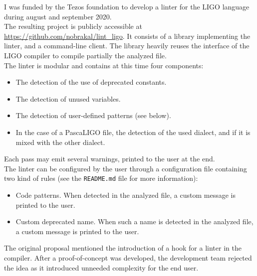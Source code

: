 I was funded by the Tezos foundation to develop a linter for the LIGO language during august and september 2020.\\
The resulting project is publicly accessible at \url{https://github.com/nobrakal/lint\_ligo}.
It consists of a library implementing the linter, and a command-line client.
The library heavily reuses the interface of the LIGO compiler to compile partially the analyzed file.\\
The linter is modular and contains at this time four components:

\begin{itemize}
\item The detection of the use of deprecated constants.
\item The detection of unused variables.
\item The detection of user-defined patterns (see below).
\item In the case of a PascaLIGO file, the detection of the used dialect, and if it is mixed with the other dialect.
\end{itemize}

Each pass may emit several warnings, printed to the user at the end.\\
The linter can be configured by the user through a configuration file containing two kind of rules (see the \verb|README.md| file for more information):
\begin{itemize}
\item Code patterns. When detected in the analyzed file, a custom message is printed to the user.
\item Custom deprecated name. When such a name is detected in the analyzed file, a custom message is printed to the user.
\end{itemize}

The original proposal mentioned the introduction of a hook for a linter in the compiler. After a proof-of-concept was developed, the development team rejected the idea as it introduced unneeded complexity for the end user.